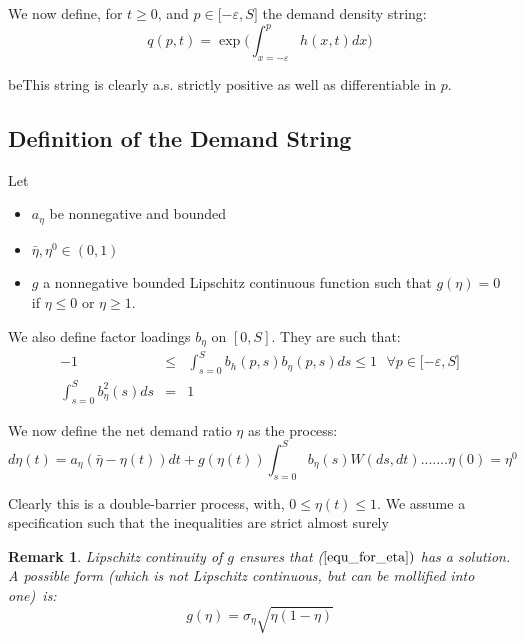 \documentclass{article}
\newtheorem{remark}{Remark}
\begin{document}
We now define, for $t\geq 0$, and $p\in \lbrack -\varepsilon ,S]$ the demand
density string:%
\begin{equation}
q(p,t)=\exp ({\int_{x=-\varepsilon }^{p}h(x,t)dx)}  \label{Def_of_q}
\end{equation}

beThis string is clearly a.s. strictly positive as well as differentiable in
$p$.

\subsection{Definition of the Demand String}

Let

\begin{itemize}
\item $a_{\eta }$ be nonnegative and bounded

\item $\bar{\eta},\eta ^{0}\in (0,1)$

\item $g$  a nonnegative bounded Lipschitz continuous function such that $%
g(\eta )=0$ if $\eta \leq 0$ or $\eta \geq 1$.
\end{itemize}

We also define factor loadings $b_{\eta }$ on $[0,S]$. They are such that:%
\begin{eqnarray}
-1 &\leq &\int_{s=0}^{S}b_{h}(p,s)b_{\eta }(p,s)ds\leq 1\text{\ \ \ \ \ \ \ }%
\forall p\in \lbrack -\varepsilon ,S]  \label{bh} \\
\int_{s=0}^{S}b_{\eta }^{2}(s)ds &=&1  \label{b_eta}
\end{eqnarray}%
\bigskip

We now define the net demand ratio $\eta $ as the process:%
\begin{equation}
d\eta (t)=a_{\eta }(\bar{\eta}-\eta (t))dt+g(\eta (t))\int_{s=0}^{S}b_{\eta
}(s)W(ds,dt)\text{.......}\eta (0)=\eta ^{0}  \label{equ_for_eta}
\end{equation}

Clearly this is a double-barrier process, with, $0\leq \eta (t)\leq 1$. We
assume a specification such that the inequalities are strict almost surely%

\begin{remark}
Lipschitz continuity of $g$ ensures that ($\ref{equ_for_eta})$ has a
solution. A possible form (which is not Lipschitz continuous, but can be
mollified into one)\ is:%
\begin{equation*}
g(\eta )=\sigma _{\eta }\sqrt{\eta (1-\eta )}
\end{equation*}
\end{remark}
\end{document}
